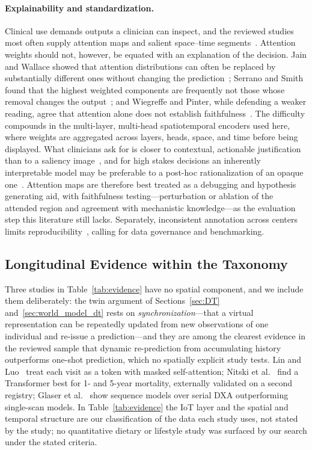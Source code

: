 \documentclass[journal]{IEEEtran}
\newif\ifsubmission
\begin{document}
\paragraph{Explainability and standardization.} Clinical use demands outputs a clinician can inspect, and the reviewed studies most often supply attention maps and salient space--time segments~\cite{2,4}. Attention weights should not, however, be equated with an explanation of the decision. Jain and Wallace showed that attention distributions can often be replaced by substantially different ones without changing the prediction~\cite{jain2019attention}; Serrano and Smith found that the highest weighted components are frequently not those whose removal changes the output~\cite{serrano2019attention}; and Wiegreffe and Pinter, while defending a weaker reading, agree that attention alone does not establish faithfulness~\cite{wiegreffe2019attention}. The difficulty compounds in the multi-layer, multi-head spatiotemporal encoders used here, where weights are aggregated across layers, heads, space, and time before being displayed. What clinicians ask for is closer to contextual, actionable justification than to a saliency image~\cite{tonekaboni2019clinicians}, and for high stakes decisions an inherently interpretable model may be preferable to a post-hoc rationalization of an opaque one~\cite{rudin2019stopexplaining}. Attention maps are therefore best treated as a debugging and hypothesis generating aid, with faithfulness testing---perturbation or ablation of the attended region and agreement with mechanistic knowledge---as the evaluation step this literature still lacks. Separately, inconsistent annotation across centers limits reproducibility~\cite{6}, calling for data governance and benchmarking.

\fi

\subsection{Longitudinal Evidence within the Taxonomy}
\label{sec:longitudinal}
\ifsubmission
Three studies in Table~\ref{tab:evidence} have no spatial component, and we include them deliberately: the twin argument of Sections~\ref{sec:DT} and~\ref{sec:world_model_dt} rests on \emph{synchronization}---that a virtual representation can be repeatedly updated from new observations of one individual and re-issue a prediction---and they are among the clearest evidence in the reviewed sample that dynamic re-prediction from accumulating history outperforms one-shot prediction, which no spatially explicit study tests. Lin and Luo~\cite{lin2022deep} treat each visit as a token with masked self-attention; Nitski et al.~\cite{nitski2021long} find a Transformer best for 1- and 5-year mortality, externally validated on a second registry; Glaser et al.~\cite{glaser2022deep} show sequence models over serial DXA outperforming single-scan models. In Table~\ref{tab:evidence} the IoT layer and the spatial and temporal structure are our classification of the data each study uses, not stated by the study; no quantitative dietary or lifestyle study was surfaced by our search under the stated criteria.
\end{document}
